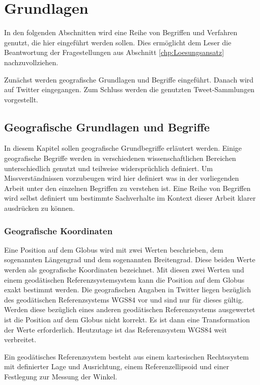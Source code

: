 \chapter{Grundlagen} \label{chp:Grundlagen}  
In den folgenden Abschnitten wird eine Reihe von Begriffen und Verfahren genutzt, die hier eingeführt werden sollen.     
Dies ermöglicht dem Leser die Beantwortung der Fragestellungen aus Abschnitt \ref{chp:Loesungsansatz} nachzuvollziehen.    
 
Zunächst werden geografische Grundlagen und Begriffe eingeführt. 
Danach wird auf Twitter eingegangen.   
Zum Schluss werden die genutzten Tweet-Sammlungen vorgestellt.

\newpage

	\section{Geografische Grundlagen und Begriffe}
	
		In diesem Kapitel sollen geografische Grundbegriffe erläutert werden. 
		Einige geografische Begriffe werden in verschiedenen wissenschaftlichen Bereichen unterschiedlich genutzt und teilweise widersprüchlich definiert. 
		Um Missverständnissen vorzubeugen wird hier definiert was in der vorliegenden Arbeit unter den einzelnen Begriffen zu verstehen ist.
		Eine Reihe von Begriffen wird selbst definiert um bestimmte Sachverhalte im Kontext dieser Arbeit klarer ausdrücken zu können. 

		\subsection{Geografische Koordinaten} 

			Eine Position auf dem Globus wird mit zwei Werten beschrieben, dem sogenannten Längengrad und dem sogenannten Breitengrad.
			Diese beiden Werte werden als geografische Koordinaten bezeichnet. 
			Mit diesen zwei Werten und einem geodätischen Referenzsystemsystem kann die Position auf dem Globus exakt bestimmt werden.  
			Die geografischen Angaben in Twitter liegen bezüglich des geodätischen Referenzsystems WGS84 vor und sind nur für dieses gültig.
			Werden diese bezüglich eines anderen geodätischen Referenzsystems ausgewertet ist die Position auf dem Globus nicht korrekt.
			Es ist dann eine Transformation der Werte erforderlich.
			Heutzutage ist das Referenzsystem WGS84 weit verbreitet.

			Ein geodätisches Referenzsystem besteht aus einem kartesischen Rechtssystem mit definierter Lage und Ausrichtung, einem Referenzellipsoid und einer Festlegung zur Messung der Winkel.

